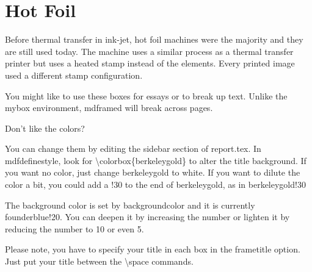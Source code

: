   \section{Hot Foil}

  Before thermal transfer in ink-jet, hot foil machines were the majority and they are still used today. The machine uses a similar process as a thermal transfer printer but uses a heated stamp instead of the elements. Every printed image used a different stamp configuration.

\begin{mdframed}[style=custom,frametitle=\colorbox{berkeleygold}{\space Put your title here \space}]

You might like to use these boxes for essays or to break up text. Unlike the mybox environment, mdframed will break across pages.

Don't like the colors?

You can change them by editing the sidebar section of report.tex. In mdfdefinestyle, look for \textbackslash colorbox\{berkeleygold\} to alter the title background. If you want no color, just change berkeleygold to white. If you want to dilute the color a bit, you could add a !30 to the end of berkeleygold, as in berkeleygold!30

The background color is set by backgroundcolor and it is currently founderblue!20. You can deepen it by increasing the number or lighten it by reducing the number to 10 or even 5.

\end{mdframed}


\begin{mdframed}[style=custom,frametitle=\colorbox{berkeleygold}{\space This is my second box \space}]

Please note, you have to specify your title in each box in the frametitle option. Just put your title between the \textbackslash space commands.

\end{mdframed}

